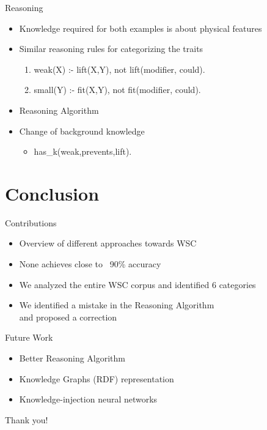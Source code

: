 \documentclass[smaller,dvipsnames,ratio=169]{beamer}
\begin{document}
\begin{frame}{Reasoning}
	\begin{itemize}
		\item Knowledge required for both examples is about \alert{physical features} 
		\item Similar reasoning rules for categorizing the traits
		\begin{enumerate}
			\normalsize
			\item weak(X) :- lift(X,Y), not lift(modifier, could).
			\item small(Y) :- fit(X,Y), not fit(modifier, could).
		\end{enumerate}
		\item Reasoning Algorithm
		\item Change of background knowledge
		\begin{itemize}
			\normalsize
			\item has\_k(weak,prevents,lift).
		\end{itemize} 
		
	\end{itemize}
\end{frame} 

  
\section{Conclusion}
 
\begin{frame}{Contributions}
    \begin{itemize}
      \normalsize
      \item Overview of different approaches towards WSC
      \item None achieves close to ~90\% accuracy 
      \item We \alert{analyzed} the entire WSC corpus and identified 6 categories
      \item We identified a mistake in the Reasoning Algorithm \\and proposed a correction    
    \end{itemize}
  \end{frame}

\begin{frame}{Future Work}
	\begin{itemize}
		\normalsize
		\item Better Reasoning Algorithm
		\item Knowledge Graphs (RDF) representation
		\item Knowledge-injection neural networks
	\end{itemize}

\end{frame}


  \begin{frame}[standout]
    Thank you!
  \end{frame}

\end{document}

